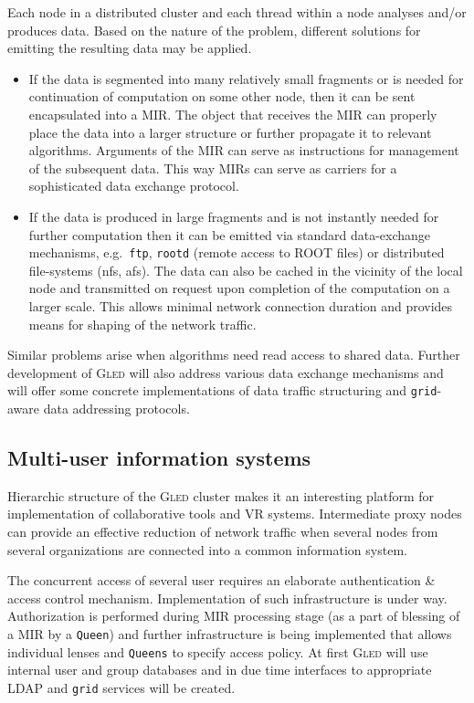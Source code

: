 \documentclass[final]{siamltex}
\def\gled{\textsc{Gled}\xspace}
\def\grid{\texttt{grid}\xspace}
\def\smalltt#1{{\small\texttt{#1}}}
\begin{document}
Each node in a distributed cluster and each thread within a node
analyses and/or produces data. Based on the nature of the problem,
different solutions for emitting the resulting data may be applied.
\begin{itemize}
\item If the data is segmented into many relatively small fragments or
  is needed for continuation of computation on some other node, then
  it can be sent encapsulated into a MIR. The object that
  receives the MIR can properly place the data into a larger structure or
  further propagate it to relevant algorithms. Arguments of the MIR
  can serve as instructions for management of the subsequent data.
  This way MIRs can serve as carriers for a sophisticated data
  exchange protocol.
\item If the data is produced in large fragments and is not
  instantly needed for further computation then it can be emitted via
  standard data-exchange mechanisms, e.g.\  \smalltt{ftp},
  \smalltt{rootd} (remote access to ROOT files) or distributed
  file-systems (nfs, afs). The data can also be cached in the vicinity
  of the local node and transmitted on request upon completion of the
  computation on a larger scale. This allows minimal network
  connection duration and provides means for shaping of the network
  traffic.
\end{itemize}
Similar problems arise when algorithms need read access to shared
data. Further development of \gled will also address various data
exchange mechanisms and will offer some concrete implementations of
data traffic structuring and \grid-aware data addressing protocols.

\subsection{Multi-user information systems}

Hierarchic structure of the \gled cluster makes it an interesting
platform for implementation of collaborative tools and VR systems.
Intermediate proxy nodes can provide an effective reduction of network
traffic when several nodes from several organizations are connected
into a common information system.

The concurrent access of several user requires an elaborate
authentication \& access control mechanism. Implementation of such
infrastructure is under way. Authorization is performed during MIR
processing stage (as a part of blessing of a MIR by a \smalltt{Queen})
and further infrastructure is being implemented that allows individual
lenses and \smalltt{Queens} to specify access policy. At first \gled
will use internal user and group databases and in due time interfaces
to appropriate LDAP and \grid services will be created.
\end{document}
